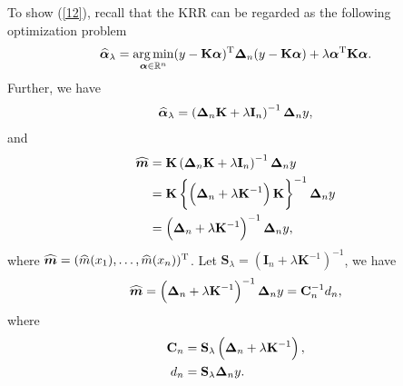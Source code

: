 \documentclass[12pt]{article}
\DeclareMathOperator*{\argmin}{arg\,min}
\newcommand{\bx}{{x}}
\newcommand{\bd}{{d}}
\newcommand{\by}{{y}}
\newcommand{\bmm}{\bm{m}}
\newcommand{\bI}{\mathbf{I}}
\newcommand{\bC}{\mathbf{C}}
\newcommand{\bK}{\mathbf{K}}
\newcommand{\bS}{\mathbf{S}}
\newcommand{\balpha}{\boldsymbol{\alpha}}
\newcommand{\bDelta}{\boldsymbol{\Delta}}
\def\trans{^{\rm T}}
\def\wh{\widehat}
\begin{document}
To show (\ref{12}), recall that the KRR can be regarded as the following optimization problem
\begin{align}
 \wh{\balpha}_{\lambda} = \argmin_{\balpha \in \mathbb{R}^{n}} (\by - \bK\balpha)\trans \bDelta_{n} (\by - \bK \balpha) + \lambda \balpha\trans \bK \balpha.\notag 
\end{align}
Further, we have
\begin{align}
  \wh{\balpha}_{\lambda} = \left( \bDelta_{n} \bK + \lambda \bI_{n}  \right)^{-1} \bDelta_{n}\by,\notag
\end{align}
and 
\begin{align}
 \wh{\bmm} &= \bK \left(  \bDelta_{n}\bK + \lambda \bI_{n}    \right)^{-1} \bDelta_{n}\by \notag \\
 &= \bK  \left\{  \left(  \bDelta_{n} + \lambda \bK^{-1}    \right) \bK     \right\}^{-1} \bDelta_{n} \by \notag \\
 &=  \left(    \bDelta_{n} + \lambda \bK^{-1}   \right)^{-1}  \bDelta_{n}\by,\notag
\end{align}
where $\wh{\bmm} = (\wh{m}(\bx_{1}), \ldots, \wh{m}(\bx_{n}))\trans$. Let $\bS_{\lambda} =  (  \bI_{n} + \lambda \bK^{-1}   )^{-1}$, we have
\begin{align}
 \wh{\bmm} = \left( \bDelta_{n} + \lambda \bK^{-1}  \right)^{-1}\bDelta_{n}\by = \bC_{n}^{-1} \bd_{n},\notag
\end{align}
where
\begin{align}
\bC_{n} &= \bS_{\lambda}\left( \bDelta_{n} + \lambda\bK^{-1}   \right),\notag\\
\bd_{n} &= \bS_{\lambda}\bDelta_{n}\by\notag.
\end{align}
\end{document}
